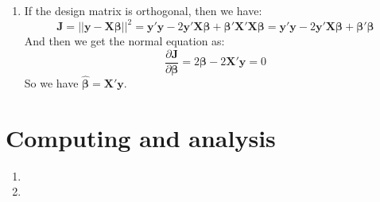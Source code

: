 \documentclass[12pt]{article}
\newcommand{\ttt}[1]{\textbf{#1}}
\begin{document}
\begin{enumerate}
\begin{proof}
        Therefore we can see that the three matrices above all have and only have $r$ nonzero singular values, which means they are all of rank $r$.
        Then we get $rank(\ttt{X}) = rank(\ttt{X}') = rank(\ttt{X}'\ttt{X}) = rank(\ttt{X}\ttt{X}')$.
    \end{proof}
    \item
    If the design matrix is orthogonal, then we have:
    $$\ttt{J} = ||\ttt{y} - \ttt{X}\bm{\beta}||^2 = \ttt{y}'\ttt{y} - 2 \ttt{y}'\ttt{X}\bm{\beta} + \bm{\beta}' \ttt{X}'\ttt{X} \bm{\beta} = \ttt{y}'\ttt{y} - 2 \ttt{y}'\ttt{X}\bm{\beta} + \bm{\beta}'\bm{\beta}$$
    And then we get the normal equation as:
    $$\frac{\partial \ttt{J}}{\partial \bm{\beta}} = 2 \bm{\beta} - 2 \ttt{X}'\ttt{y} = 0$$
    So we have $\hat{\bm{\beta}} = \ttt{X}'\ttt{y}$. 
\end{enumerate}

\section{Computing and analysis}

\begin{enumerate}   
    \item
    \item

\end{enumerate} 
\end{document}
